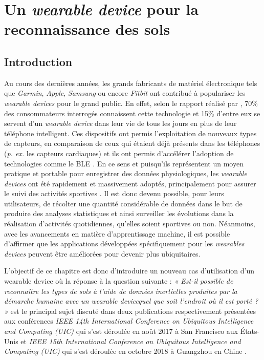 \chapter{Un \textit{wearable device} pour la reconnaissance des sols}
\label{chap:4}

\section{Introduction}

Au cours des dernières années, les grands fabricants de matériel électronique tels que \textit{Garmin}, \textit{Apple}, \textit{Samsung} ou encore \textit{Fitbit} ont contribué à populariser les \textit{wearable devices} pour le grand public. En effet, selon le rapport réalisé par \cite{Nielsen2014}, 70\% des consommateurs interrogés connaissent cette technologie et 15\% d'entre eux se servent d'un \textit{wearable device} dans leur vie de tous les jours en plus de leur téléphone intelligent. Ces dispositifs ont permis l'exploitation de nouveaux types de capteurs, en comparaison de ceux qui étaient déjà présents dans les téléphones (\textit{p. ex.} les capteurs cardiaques) et ils ont permis d'accélérer l'adoption de technologies comme le \acs{BLE} \citep{Taplett}. En ce sens et puisqu'ils représentent un moyen pratique et portable pour enregistrer des données physiologiques,  les \textit{wearable devices} ont été rapidement et massivement adoptés, principalement pour assurer le suivi des activités sportives \citep{NPDGroup2015}. Il est donc devenu possible, pour leurs utilisateurs, de récolter une quantité considérable de données dans le but de produire des analyses statistiques et ainsi surveiller les évolutions dans la réalisation d'activités quotidiennes, qu'elles soient sportives ou non. Néanmoins, avec les avancements en matière d'apprentissage machine, il est possible d'affirmer que les applications développées spécifiquement pour les \textit{wearables devices} peuvent être améliorées pour devenir plus ubiquitaires.

L'objectif de ce chapitre est donc d'introduire un nouveau cas d'utilisation d'un wearable device où la réponse à la question suivante : \textit{« Est-il possible de reconnaître les types de sols à l'aide de données inertielles produites par la démarche humaine avec un wearable device\textemdash quel que soit l'endroit où il est porté ? »} est le principal sujet discuté dans deux publications respectivement présentées aux conférences \textit{IEEE 14th International Conference on Ubiquitous Intelligence and Computing (UIC)} qui s'est déroulée en août 2017 à San Francisco aux États-Unis \citep{Thullier2017a} et \textit{IEEE 15th International Conference on Ubiquitous Intelligence and Computing (UIC)} qui s'est déroulée en octobre 2018 à Guangzhou en Chine \citep{Thullier2018}.

